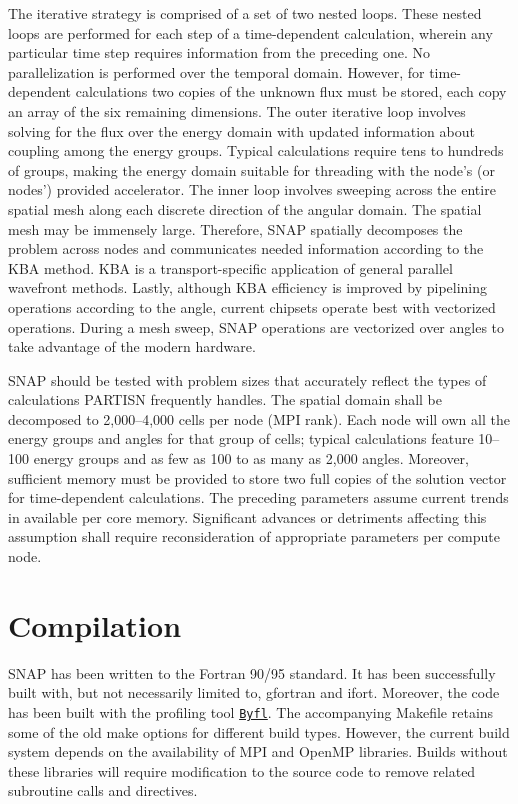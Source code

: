 The iterative strategy is comprised of a set of two nested loops. These nested loops are performed for each step of a time-\/dependent calculation, wherein any particular time step requires information from the preceding one. No parallelization is performed over the temporal domain. However, for time-\/dependent calculations two copies of the unknown flux must be stored, each copy an array of the six remaining dimensions. The outer iterative loop involves solving for the flux over the energy domain with updated information about coupling among the energy groups. Typical calculations require tens to hundreds of groups, making the energy domain suitable for threading with the node's (or nodes') provided accelerator. The inner loop involves sweeping across the entire spatial mesh along each discrete direction of the angular domain. The spatial mesh may be immensely large. Therefore, S\-N\-A\-P spatially decomposes the problem across nodes and communicates needed information according to the K\-B\-A method. K\-B\-A is a transport-\/specific application of general parallel wavefront methods. Lastly, although K\-B\-A efficiency is improved by pipelining operations according to the angle, current chipsets operate best with vectorized operations. During a mesh sweep, S\-N\-A\-P operations are vectorized over angles to take advantage of the modern hardware.

S\-N\-A\-P should be tested with problem sizes that accurately reflect the types of calculations P\-A\-R\-T\-I\-S\-N frequently handles. The spatial domain shall be decomposed to 2,000--4,000 cells per node (M\-P\-I rank). Each node will own all the energy groups and angles for that group of cells; typical calculations feature 10--100 energy groups and as few as 100 to as many as 2,000 angles. Moreover, sufficient memory must be provided to store two full copies of the solution vector for time-\/dependent calculations. The preceding parameters assume current trends in available per core memory. Significant advances or detriments affecting this assumption shall require reconsideration of appropriate parameters per compute node.

\section*{Compilation}

S\-N\-A\-P has been written to the Fortran 90/95 standard. It has been successfully built with, but not necessarily limited to, gfortran and ifort. Moreover, the code has been built with the profiling tool \href{https://github.com/losalamos/byfl}{\tt Byfl}. The accompanying Makefile retains some of the old make options for different build types. However, the current build system depends on the availability of M\-P\-I and Open\-M\-P libraries. Builds without these libraries will require modification to the source code to remove related subroutine calls and directives.

